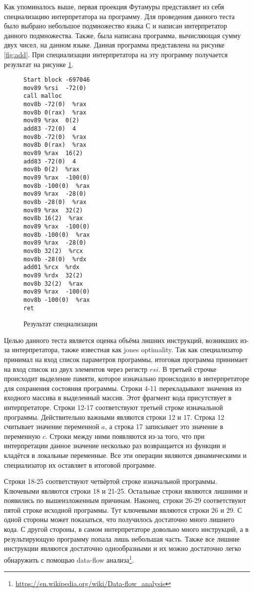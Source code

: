 Как упоминалось выше, первая проекция Футамуры представляет из себя специализацию интерпретатора на программу. Для проведения данного теста было выбрано небольшое подмножество языка С и написан интерпретатор данного подмножества. Также, была написана программа, вычисляющая сумму двух чисел, на данном языке. Данная программа представлена на рисунке \ref{fig:add}. При специализации интерпретатора на эту программу получается результат на рисунке \ref{fig:specadd}.

\begin{figure}[t]
\begin{multicols}{2}
\begin{lstlisting}
Start block -697046
mov89 %rsi  -72(0) 
call malloc
mov8b -72(0)  %rax
mov8b 0(rax)  %rax
mov89 %rax  0(2)
add83 -72(0)  4
mov8b -72(0)  %rax
mov8b 0(rax)  %rax
mov89 %rax  16(2)
add83 -72(0)  4
mov8b 0(2)  %rax 
mov89 %rax  -100(0) 
mov8b -100(0)  %rax 
mov89 %rax  -28(0) 
mov8b -28(0)  %rax 
mov89 %rax  32(2)
mov8b 16(2)  %rax 
mov89 %rax  -100(0) 
mov8b -100(0)  %rax 
mov89 %rax  -28(0) 
mov8b 32(2)  %rcx 
mov8b -28(0)  %rdx 
add01 %rcx  %rdx 
mov89 %rdx  32(2) 
mov8b 32(2)  %rax 
mov89 %rax  -100(0) 
mov8b -100(0)  %rax 
ret
\end{lstlisting}
\end{multicols}
\caption{ Результат специализации}
\label{fig:specadd}
\end{figure}

Целью данного теста является оценка объёма лишних инструкций, возникших из-за интерпретатора, также известная как jones optimality\cite{optimal}. Так как специализатор принимал на вход список параметров программы, итоговая программа принимает на вход список из двух элементов через регистр $rsi$. В третьей строчке происходит выделение памяти, которое изначально происходило в интерпретаторе для сохранения состояния программы. Строки 4-11 перекладывают значения из входного массива в выделенный массив. Этот фрагмент кода присутствует в интерпретаторе. Строки 12-17 соответствуют третьей строке изначальной программы. Действительно важными являются строки 12 и 17. Строка 12 считывает значение переменной $a$, а строка 17 записывает это значение в переменную $c$. Строки между ними появляются из-за того, что при интерпретации данное значение несколько раз возвращается из функции и кладётся в локальные переменные. Все эти операции являются динамическими и специализатор их оставляет в итоговой программе. 

Строки 18-25 соответствуют четвёртой строке изначальной программы. Ключевыми являются строки 18 и 21-25. Остальные строки являются лишними и появились по вышеизложенным причинам. Наконец, строки 26-29 соответствуют пятой строке исходной программы. Тут ключевыми являются строки 26 и 29. С одной стороны может показаться, что получилось достаточно много лишнего кода. С другой стороны, в самом интерпретаторе довольно много инструкций, а в результирующую программу попала лишь небольшая часть. Также все лишние инструкции являются достаточно однообразными и их можно достаточно легко обнаружить с помощью data-flow анализа\footnote{\url{https://en.wikipedia.org/wiki/Data-flow_analysis}}.

